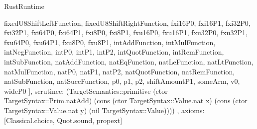\begin{lexlean}{RustRuntime}
\begin{semanticmodule}
{{      fixedU8ShiftLeftFunction,
      fixedU8ShiftRightFunction,
      fxi16P0,
      fxi16P1,
      fxi32P0,
      fxi32P1,
      fxi64P0,
      fxi64P1,
      fxi8P0,
      fxi8P1,
      fxu16P0,
      fxu16P1,
      fxu32P0,
      fxu32P1,
      fxu64P0,
      fxu64P1,
      fxu8P0,
      fxu8P1,
      intAddFunction,
      intMulFunction,
      intNegFunction,
      intP0,
      intP1,
      intP2,
      intQuotFunction,
      intRemFunction,
      intSubFunction,
      natAddFunction,
      natEqFunction,
      natLeFunction,
      natLtFunction,
      natMulFunction,
      natP0,
      natP1,
      natP2,
      natQuotFunction,
      natRemFunction,
      natSubFunction,
      natSuccFunction,
      p0,
      p1,
      p2,
      shiftAmountP1,
      someArm,
      v0,
      wideP0
    ],
    scrutinee: (TargetSemantics::primitive (ctor TargetSyntax::Prim.natAdd) (cons (ctor TargetSyntax::Value.nat x) (cons (ctor TargetSyntax::Value.nat y) (nil TargetSyntax::Value))))
  },
  axioms: [Classical.choice, Quot.sound, propext]
}


\end{semanticmodule}
\end{lexlean}
